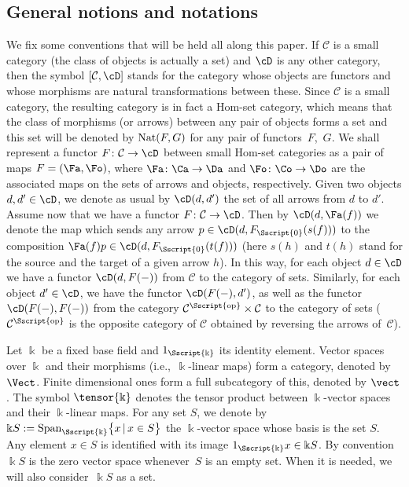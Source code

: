 \subsection{General notions and notations}\label{ssec:notation}

We fix some conventions that will be held all along this paper. If $\mathcal{C}$ is a small category (the class of objects is actually a set) and $\cD$ is any other category, then the symbol $[\mathcal{C}, \cD]$ stands for the category whose objects are functors and whose morphisms are natural transformations between these. Since $\mathcal{C}$ is a small category, the resulting category is in fact a Hom-set category, which means that the class of morphisms (or arrows) between any pair of objects forms a set and this set will be denoted by ${\rm Nat}(F,G)$ for any pair of functors~$F$,~$G$. We shall represent a functor $F \colon \mathcal{C} \to \cD$ between small Hom-set categories as a pair of maps $F=(\Fa,\Fo)$, where $\Fa\colon \Ca \to \Da$ and $\Fo\colon \Co \to \Do$ are the associated maps on the sets of arrows and objects, respectively. Given two objects $d,d' \in \cD$, we denote as usual by $\cD(d,d')$ the set of all arrows from $d$ to $d'$. Assume now that we have a functor $F\colon \mathcal{C} \to \cD$. Then by $\cD(d,\Fa(f))$ we denote the map which sends any arrow $p \in \cD(d, F_{\Sscript{0}}(s(f)))$ to the composition $\Fa(f)p \in \cD(d,F_{\Sscript{0}}(t(f)))$ (here $s(h)$ and $t(h)$ stand for the source and the target of a given arrow $h$). In this way, for each object $d \in \cD$ we have a functor $\cD(d,F(-))$ from $\mathcal{C}$ to the category of sets. Similarly, for each object $d' \in \cD$, we have the functor $\cD(F(-), d')$, as well as the functor $\cD(F(-), F(-))$ from the category $\mathcal{C}^{\Sscript{\rm op}} \times \mathcal{C}$ to the category of sets ($\mathcal{C}^{\Sscript{\rm op}}$ is the opposite category of $\mathcal{C}$ obtained by reversing the arrows of~$\mathcal{C}$).

Let $\Bbbk$ be a fixed base field and $1_{\Sscript{\Bbbk}}$ its identity element. Vector spaces over $\Bbbk$ and their morphisms (i.e.,~$\Bbbk$-linear maps) form a category, denoted by $\Vect$. Finite dimensional ones form a full subcategory of this, denoted by $\vect$. The symbol $\tensor{\Bbbk}$ denotes the tensor product between $\Bbbk$-vector spaces and their $\Bbbk$-linear maps. For any set $S$, we denote by $\Bbbk S:={\rm Span}_{\Sscript{\Bbbk}}\big\{x \,|\, x \in S \big\}$ the $\Bbbk$-vector space whose basis is the set $S$. Any element $x \in S$ is identified with its image $1_{\Sscript{\Bbbk}} x \in \Bbbk S$. By convention $\Bbbk S$ is the zero vector space whenever~$S$ is an empty set. When it is needed, we will also consider~$\Bbbk S$ as a set.

